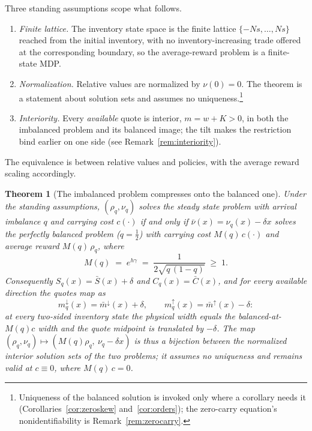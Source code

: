 \documentclass[11pt]{article}
\newtheorem{theorem}{Theorem}
\begin{document}
Three standing assumptions scope what follows.
\begin{enumerate}
\item \emph{Finite lattice.} The inventory state space is the finite lattice $\{-Ns, \dots, Ns\}$ reached from the initial inventory, with no inventory-increasing trade offered at the corresponding boundary, so the average-reward problem is a finite-state MDP.
\item \emph{Normalization.} Relative values are normalized by $\nu(0) = 0$. The theorem is a statement about solution sets and assumes no uniqueness.\footnote{Uniqueness of the balanced solution is invoked only where a corollary needs it (Corollaries~\ref{cor:zeroskew} and~\ref{cor:orders}); the zero-carry equation's nonidentifiability is Remark~\ref{rem:zerocarry}.}
\item \emph{Interiority.} Every \emph{available} quote is interior, $m = w + K > 0$, in both the imbalanced problem and its balanced image; the tilt makes the restriction bind earlier on one side (see Remark~\ref{rem:interiority}).
\end{enumerate}
The equivalence is between relative values and policies, with the average reward scaling accordingly.

\begin{theorem}[The imbalanced problem compresses onto the balanced one]\label{thm:main}
Under the standing assumptions, $(\rho_q, \nu_q)$ solves the steady state problem with arrival imbalance $q$ and carrying cost $c(\cdot)$ if and only if $\bar\nu(x) = \nu_q(x) - \delta x$ solves the perfectly balanced problem ($q = \tfrac12$) with carrying cost $M(q)\,c(\cdot)$ and average reward $M(q)\,\rho_q$, where
\begin{equation}
M(q) \;=\; e^{h\gamma} \;=\; \frac{1}{2\sqrt{q\,(1-q)}} \;\ge\; 1 .
\label{eq:multiplier}
\end{equation}
Consequently $S_q(x) = \bar S(x) + \delta$ and $C_q(x) = \bar C(x)$, and for every available direction the quotes map as
\[
m^{\downarrow}_q(x) = \bar m^{\downarrow}(x) + \delta, \qquad
m^{\uparrow}_q(x) = \bar m^{\uparrow}(x) - \delta :
\]
at every two-sided inventory state the physical width equals the balanced-at-$M(q)c$ width and the quote midpoint is translated by $-\delta$. The map $(\rho_q, \nu_q) \mapsto (M(q)\rho_q,\ \nu_q - \delta x)$ is thus a bijection between the normalized interior solution sets of the two problems; it assumes no uniqueness and remains valid at $c \equiv 0$, where $M(q)\,c = 0$.
\end{theorem}
\end{document}
